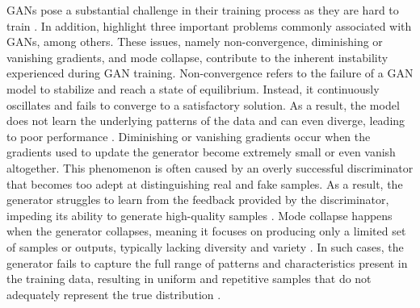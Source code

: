 GANs pose a substantial challenge in their training process as they are hard to train \citep{goodfellowGAN}. In addition, \citeauthor{brophyGAN} highlight three important problems commonly associated with GANs, among others. These issues, namely non-convergence, diminishing or vanishing gradients, and mode collapse, contribute to the inherent instability experienced during GAN training. Non-convergence refers to the failure of a GAN model to stabilize and reach a state of equilibrium. Instead, it continuously oscillates and fails to converge to a satisfactory solution. As a result, the model does not learn the underlying patterns of the data and can even diverge, leading to poor performance \citep{brophyGAN}. Diminishing or vanishing gradients occur when the gradients used to update the generator become extremely small or even vanish altogether. This phenomenon is often caused by an overly successful discriminator that becomes too adept at distinguishing real and fake samples. As a result, the generator struggles to learn from the feedback provided by the discriminator, impeding its ability to generate high-quality samples \citep{brophyGAN}. Mode collapse happens when the generator collapses, meaning it focuses on producing only a limited set of samples or outputs, typically lacking diversity and variety \citep{salimansNIPS}. In such cases, the generator fails to capture the full range of patterns and characteristics present in the training data, resulting in uniform and repetitive samples that do not adequately represent the true distribution \citep{brophyGAN}.

